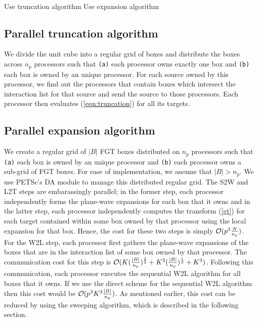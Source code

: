 {\tt
\begin{algorithmic}
\STATE
     \STATE Use truncation algorithm 
  \ELSE 
     \STATE Use expansion algorithm
  \ENDIF
\STATE
\end{algorithmic}
}


\subsection{Parallel truncation algorithm}
We divide the unit cube into a regular grid of boxes and distribute the boxes across $n_p$ processors
 such that {\tt{(a)}} each processor owns exactly one box and {\tt{(b)}} each box is owned by an unique processor.
 For each source owned by this processor, we find out the processors that contain boxes which intersect the interaction list
 for that source and send the source to those processors. Each processor then evaluates (\ref{eqn:truncation}) for all its targets.
 
\subsection{Parallel expansion algorithm} 
We create a regular grid of $|B|$ FGT boxes distributed on $n_p$ processors 
such that {\tt{(a)}} each box is owned by an unique processor and {\tt{(b)}} each processor owns a 
sub-grid of FGT boxes. For ease of implementation, we assume that $|B| > n_p$. 
 We use PETSc's \cite{petsc-user-ref, petsc-home-page} DA module to manage this distributed regular grid.
 The S2W and L2T steps are embarassingly parallel; in the former step, each processor independently forms the 
 plane-wave expansions for each box that it owns and in the latter step, each processor
 independently computes the transform (\ref{gt}) for each target contained within some box owned by
  that processor using the local expansion for that box. Hence, the cost for these two steps is 
  simply $\mathcal{O}(p^3 \frac{N}{n_p})$. For the W2L step, each processor first gathers the plane-wave expansions of
  the boxes that are in the interaction list of some box owned by that processor. The communication cost for
  this step is $\mathcal{O}(K (\frac{|B|}{n_p})^{\frac{2}{3}} + K^2(\frac{|B|}{n_p})^{\frac{1}{3}} + K^3 )$.
Following this communication, each processor executes the sequential W2L algorithm for all boxes that it owns. 
 If we use the direct scheme for the sequential W2L algorithm then this cost would be $\mathcal{O}(p^3 K^3 \frac{|B|}{n_p})$.
 As mentioned earlier, this cost can be reduced by using the sweeping algorithm, which is described in the following section. 


